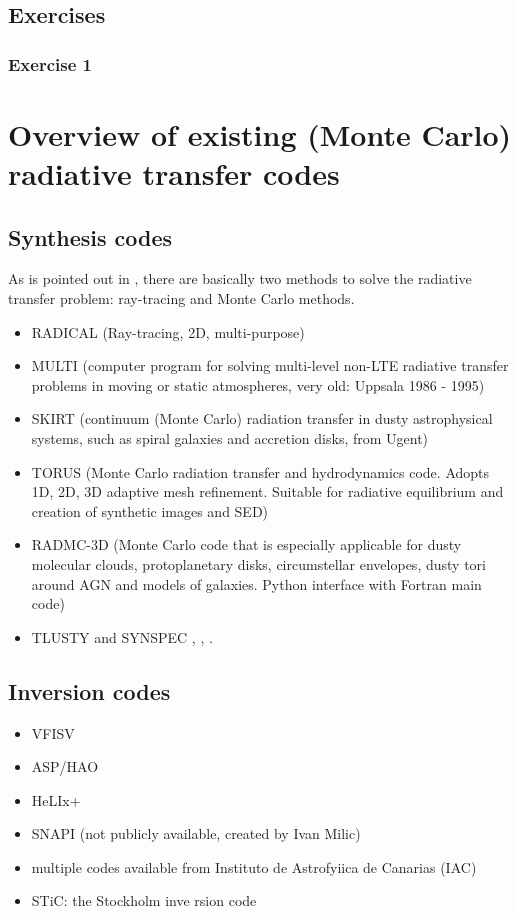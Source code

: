 \documentclass[../main/main.tex]{subfiles}
\begin{document}
\subsection{Exercises}
\subsubsection{Exercise 1}

\newpage
\section{Overview of existing (Monte Carlo) radiative transfer codes}

\subsection{Synthesis codes}
As is pointed out in \cite{PinteChristophe2015CRT}, there are basically two methods to solve the radiative transfer problem: ray-tracing and Monte Carlo methods.

\begin{itemize}
\item RADICAL \cite{RADICAL}  (Ray-tracing, 2D, multi-purpose)
\item MULTI \cite{MULTI} \cite{Carlsson1986} (computer program for solving multi-level non-LTE radiative transfer problems in moving or static atmospheres, very old: Uppsala 1986 - 1995)
\item SKIRT \cite{Camps2015} (continuum (Monte Carlo) radiation transfer in dusty astrophysical systems, such as spiral galaxies and accretion disks, from Ugent)
\item TORUS \cite{Harries2019} (Monte Carlo radiation transfer and hydrodynamics code. Adopts 1D, 2D, 3D adaptive mesh refinement. Suitable for radiative equilibrium and creation of synthetic images and SED)
\item RADMC-3D \cite{RADMC3D} (Monte Carlo code that is especially applicable for dusty molecular clouds, protoplanetary disks, circumstellar envelopes, dusty tori around AGN and models of galaxies. Python interface with Fortran main code)
\item TLUSTY and SYNSPEC \cite{Hubeny2017}, \cite{Hubeny2017a}, \cite{Hubeny2017b}.
\end{itemize}

\subsection{Inversion codes}
\begin{itemize}
\item VFISV
\item ASP/HAO
\item HeLIx+
\item SNAPI (not publicly available, created by Ivan Milic)
\item multiple codes available from Instituto de Astrofyiica de Canarias (IAC)
\item STiC: the Stockholm inve rsion code
\end{itemize}
\end{document}
